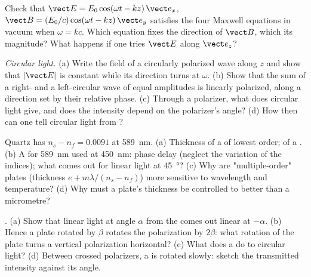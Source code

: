 \begin{exercise}[$\star$]\label{exo:b2:plane-waves-polarization:4}
Check that $\vect E = E_0\cos(\omega t - kz)\,\vect e_x$, $\vect B = (E_0/c)\cos(\omega t
- kz)\,\vect e_y$ satisfies the four Maxwell equations in vacuum when $\omega =
kc$. Which equation fixes the direction of $\vect B$, which its
magnitude? What happens if one tries $\vect E$ along $\vect e_z$?
\end{exercise}

\begin{exercise}[$\star\star$]\label{exo:b2:plane-waves-polarization:5}
\emph{Circular light.} (a) Write the field of a circularly polarized
wave along $z$ and show that $|\vect E|$ is constant while its direction
turns at $\omega$. (b) Show that the sum of a right- and a left-circular
wave of equal amplitudes is linearly polarized, along a direction set by
their relative phase. (c) Through a polarizer, what does circular light
give, and does the intensity depend on the polarizer's angle? (d) How
then can one tell circular light from ?
\end{exercise}

\begin{exercise}[$\star\star$]\label{exo:b2:plane-waves-polarization:6}
Quartz has $n_s - n_f = 0.0091$ at \qty{589}{nm}. (a) Thickness of a
 of lowest order; of a . (b) A
 for \qty{589}{nm} used at \qty{450}{nm}: phase delay
(neglect the variation of the indices); what comes out for linear light
at \qty{45}{\degree}? (c) Why are "multiple-order" plates (thickness $e +
m\lambda/(n_s - n_f)$) more sensitive to wavelength and temperature? (d) Why
must a plate's thickness be controlled to better than a micrometre?
\end{exercise}

\begin{exercise}[$\star\star$]\label{exo:b2:plane-waves-polarization:7}
. (a) Show that linear light at angle $\alpha$ from the
 comes out linear at $-\alpha$. (b) Hence a plate rotated by $\beta$
rotates the polarization by $2\beta$: what rotation of the plate turns a
vertical polarization horizontal? (c) What does a  do to
circular light? (d) Between crossed polarizers, a  is
rotated slowly: sketch the transmitted intensity against its angle.
\end{exercise}

